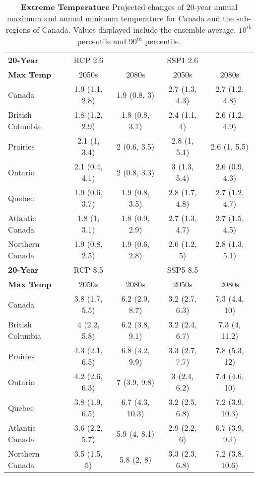 \documentclass[]{scrartcl}
\begin{document}
\begin{table}[t]
	\caption{\textbf{Extreme Temperature} Projected changes of 20-year annual maximum and annual minimum temperature for Canada and the sub-regions of Canada. Values displayed include the ensemble average, $10^{th}$ percentile and $90^{th}$ percentile.}\label{table:bc_rp20_tas}
	\begin{center}
		\begin{tabularx}{\linewidth}{|L|cc|cc|} 
			\hline
			\textbf{20-Year} & RCP 2.6 & & SSP1 2.6 &   \\
			\textbf{Max Temp}                & 2050s & 2080s & 2050s &2080s \\
			\hline
			Canada & 1.9 (1.1, 2.8) & 1.9 (0.8, 3) & 2.7 (1.3, 4.3) & 2.7 (1.2, 4.8) \\ 
			British Columbia & 1.8 (1.2, 2.9) & 1.8 (0.8, 3.1) & 2.4 (1.1, 4) & 2.6 (1.2, 4.9) \\ 
			Prairies & 2.1 (1, 3.4) & 2 (0.6, 3.5) & 2.8 (1, 5.1) & 2.6 (1, 5.5) \\ 
			Ontario & 2.1 (0.4, 4.1) & 2 (0.8, 3.3) & 3 (1.3, 5.4) & 2.6 (0.9, 4.3) \\ 
			Quebec & 1.9 (0.6, 3.7) & 1.9 (0.8, 3.5) & 2.8 (1.7, 4.8) & 2.7 (1.2, 4.7) \\ 
			Atlantic Canada & 1.8 (1, 3.1) & 1.8 (0.9, 2.9) & 2.7 (1.3, 4.7) & 2.7 (1.5, 4.5) \\ 
			Northern Canada & 1.9 (0.8, 2.5) & 1.9 (0.6, 2.8) & 2.6 (1.2, 5) & 2.8 (1.3, 5.1) \\ 
			\hline
			\textbf{20-Year} & RCP 8.5 & & SSP5 8.5 &   \\
			\textbf{Max Temp}			& 2050s & 2080s & 2050s &2080s \\
			\hline
			Canada & 3.8 (1.7, 5.5) & 6.2 (2.9, 8.7) & 3.2 (2.7, 6.3) & 7.3 (4.4, 10) \\ 
			British Columbia & 4 (2.2, 5.8) & 6.2 (3.8, 9.1) & 3.2 (2.4, 6.7) & 7.3 (4, 11.2) \\ 
			Prairies & 4.3 (2.1, 6.5) & 6.8 (3.2, 9.9) & 3.3 (2.7, 7.7) & 7.8 (5.3, 12) \\ 
			Ontario & 4.2 (2.6, 6.3) & 7 (3.9, 9.8) & 3 (2.4, 6.2) & 7.4 (4.6, 10) \\ 
			Quebec & 3.8 (1.9, 6.5) & 6.7 (4.3, 10.3) & 3.2 (2.5, 6.8) & 7.2 (3.9, 10.3) \\ 
			Atlantic Canada & 3.6 (2.2, 5.7) & 5.9 (4, 8.1) & 2.9 (2.2, 6) & 6.7 (3.9, 9.4) \\ 
			Northern Canada & 3.5 (1.5, 5) & 5.8 (2, 8) & 3.3 (2.3, 6.8) & 7.2 (3.8, 10.6) \\ 

\end{tabularx}
\end{center}
\end{table}
\end{document}

